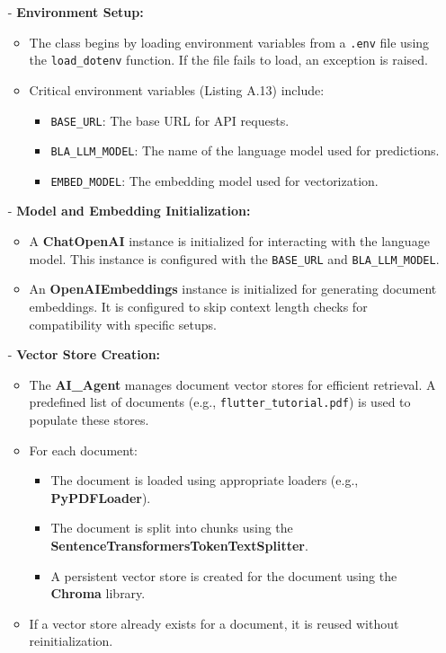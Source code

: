\begin{itemize}
    \item[-] \textbf{Environment Setup:}
    \begin{itemize}
        \item The class begins by loading environment variables from a \texttt{.env} file using the \texttt{load\_dotenv} function. If the file fails to load, an exception is raised.
        \item Critical environment variables (Listing A.13) include:
        \begin{itemize}
            \item \texttt{BASE\_URL}: The base URL for API requests.
            \item \texttt{BLA\_LLM\_MODEL}: The name of the language model used for predictions.
            \item \texttt{EMBED\_MODEL}: The embedding model used for vectorization.
        \end{itemize}
    \end{itemize}

    \item[-] \textbf{Model and Embedding Initialization:}
    \begin{itemize}
        \item A \textbf{ChatOpenAI} instance is initialized for interacting with the language model. This instance is configured with the \texttt{BASE\_URL} and \texttt{BLA\_LLM\_MODEL}.
        \item An \textbf{OpenAIEmbeddings} instance is initialized for generating document embeddings. It is configured to skip context length checks for compatibility with specific setups.
    \end{itemize}

    \item[-] \textbf{Vector Store Creation:}
    \begin{itemize}
        \item The \textbf{AI\_Agent} manages document vector stores for efficient retrieval. A predefined list of documents (e.g., \texttt{flutter\_tutorial.pdf}) is used to populate these stores.
        \item For each document:
        \begin{itemize}
            \item The document is loaded using appropriate loaders (e.g., \textbf{PyPDFLoader}).
            \item The document is split into chunks using the \textbf{SentenceTransformersTokenTextSplitter}.
            \item A persistent vector store is created for the document using the \textbf{Chroma} library.
        \end{itemize}
        \item If a vector store already exists for a document, it is reused without reinitialization.
    \end{itemize}


\end{itemize}
